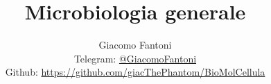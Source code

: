 

\title{\Huge \textbf{Microbiologia generale}}

\author{
  Giacomo Fantoni \\
  \small Telegram: \href{https://t.me/GiacomoFantoni}{@GiacomoFantoni} \\[3pt]
  \small Github: \href{https://github.com/giacThePhantom/BioMolCellula}{https://github.com/giacThePhantom/BioMolCellula}}

\maketitle
\tableofcontents


